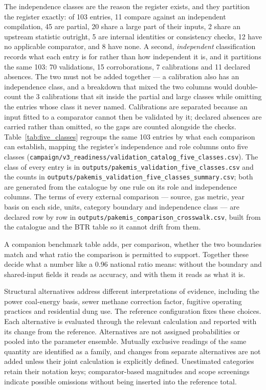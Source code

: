\documentclass[essd]{copernicus}
\begin{document}
The independence classes are the reason the register exists, and they partition the register exactly: of \num{103} entries, \num{11} compare against an independent compilation, \num{45} are partial, \num{20} share a large part of their inputs, \num{2} share an upstream statistic outright, \num{5} are internal identities or consistency checks, \num{12} have no applicable comparator, and \num{8} have none. A second, \emph{independent} classification records what each entry is for rather than how independent it is, and it partitions the same \num{103}: \num{70} validations, \num{15} corroborations, \num{7} calibrations and \num{11} declared absences. The two must not be added together --- a calibration also has an independence class, and a breakdown that mixed the two columns would double-count the \num{3} calibrations that sit inside the partial and large classes while omitting the entries whose class it never named. Calibrations are separated because an input fitted to a comparator cannot then be validated by it; declared absences are carried rather than omitted, so the gaps are counted alongside the checks.
Table~\ref{tab:five_classes} regroups the same \num{103} entries by what each comparison can establish, mapping the register's independence and role columns onto five classes (\texttt{campaign/v3\_readiness/validation\_catalog\_five\_classes.csv}).
 The class of every entry is in \texttt{outputs/pakemis\_validation\_five\_classes.csv} and the counts in \texttt{outputs/pakemis\_validation\_five\_classes\_summary.csv}; both are generated from the catalogue by one rule on its role and independence columns. The terms of every external comparison --- source, gas metric, year basis on each side, units, category boundary and independence class --- are declared row by row in \texttt{outputs/pakemis\_comparison\_crosswalk.csv}, built from the catalogue and the BTR table so it cannot drift from them.

A companion benchmark table adds, per comparison, whether the two boundaries match and what ratio the comparison is permitted to support. Together these decide what a number like a \num{0.96} national ratio means: without the boundary and shared-input fields it reads as accuracy, and with them it reads as what it is.

Structural alternatives address different interpretations of evidence, including the power coal-energy basis, sewer methane correction factor, fugitive operating practices and residential dung use. The reference configuration fixes these choices. Each alternative is evaluated through the relevant calculation and reported with its change from the reference. Alternatives are not assigned probabilities or pooled into the parameter ensemble. Mutually exclusive readings of the same quantity are identified as a family, and changes from separate alternatives are not added unless their joint calculation is explicitly defined. Unestimated categories retain their notation keys; comparator-based magnitudes and scope screenings indicate possible omissions without being inserted into the reference total.
\end{document}
